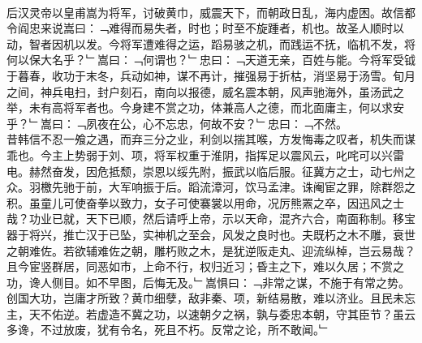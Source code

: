 \\
后汉灵帝以皇甫嵩为将军，讨破黄巾，威震天下，而朝政日乱，海内虚困。故信都令阎忠来说嵩曰：﹁难得而易失者，时也；时至不旋踵者，机也。故圣人顺时以动，智者因机以发。今将军遭难得之运，蹈易骇之机，而践运不抚，临机不发，将何以保大名乎？﹂嵩曰：﹁何谓也？﹂忠曰：﹁天道无亲，百姓与能。今将军受钺于暮春，收功于末冬，兵动如神，谋不再计，摧强易于折枯，消坚易于汤雪。旬月之间，神兵电扫，封户刻石，南向以报德，威名震本朝，风声驰海外，虽汤武之举，未有高将军者也。今身建不赏之功，体兼高人之德，而北面庸主，何以求安乎？﹂嵩曰：﹁夙夜在公，心不忘忠，何故不安？﹂忠曰：﹁不然。\\
昔韩信不忍一飧之遇，而弃三分之业，利剑以揣其喉，方发悔毒之叹者，机失而谋乖也。今主上势弱于刘、项，将军权重于淮阴，指挥足以震风云，叱咤可以兴雷电。赫然奋发，因危抵颓，崇恩以绥先附，振武以临后服。征冀方之士，动七州之众。羽檄先驰于前，大军响振于后。蹈流漳河，饮马孟津。诛阉宦之罪，除群怨之积。虽童儿可使奋拳以致力，女子可使褰裳以用命，况厉熊罴之卒，因迅风之士哉？功业已就，天下已顺，然后请呼上帝，示以天命，混齐六合，南面称制。移宝器于将兴，推亡汉于已坠，实神机之至会，风发之良时也。夫既朽之木不雕，衰世之朝难佐。若欲辅难佐之朝，雕朽败之木，是犹逆阪走丸、迎流纵棹，岂云易哉？且今宦竖群居，同恶如市，上命不行，权归近习；昏主之下，难以久居；不赏之功，谗人侧目。如不早图，后悔无及。﹂嵩惧曰：﹁非常之谋，不施于有常之势。创国大功，岂庸才所致？黄巾细孽，敌非秦、项，新结易散，难以济业。且民未忘主，天不佑逆。若虚造不冀之功，以速朝夕之祸，孰与委忠本朝，守其臣节？虽云多谗，不过放废，犹有令名，死且不朽。反常之论，所不敢闻。﹂
